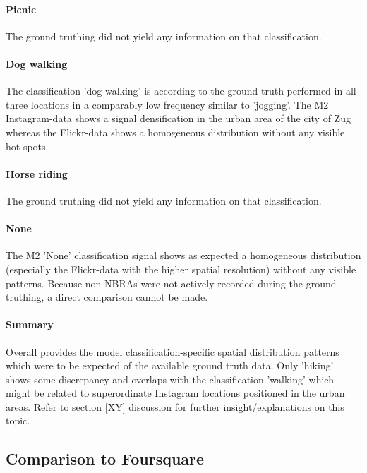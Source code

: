 \paragraph*{Picnic}
The ground truthing did not yield any information on that classification.

\paragraph*{Dog walking}
The classification 'dog walking' is according to the ground truth performed in all three locations in a comparably low frequency similar to 'jogging'.  The M2 Instagram-data shows a signal densification in the urban area of the city of Zug whereas the Flickr-data shows a homogeneous distribution without any visible hot-spots.

\paragraph*{Horse riding}
The ground truthing did not yield any information on that classification.

\paragraph*{None} The M2 'None' classification signal shows as expected a homogeneous distribution (especially the Flickr-data with the higher spatial resolution) without any visible patterns. Because non-NBRAs were not actively recorded during the ground truthing, a direct comparison cannot be made.

\paragraph*{Summary}
Overall provides the model classification-specific spatial distribution patterns which were to be expected of the available ground truth data. Only 'hiking' shows some discrepancy and overlaps with the classification 'walking' which might be related to superordinate Instagram locations positioned in the urban areas. Refer to section \ref{XY} discussion for further insight/explanations on this topic. 


\subsection{Comparison to Foursquare}


